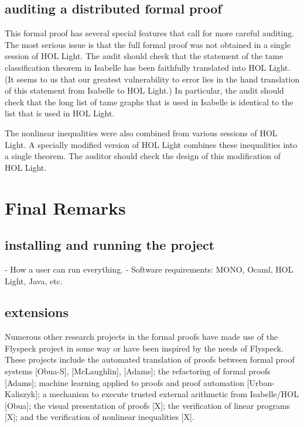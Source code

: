 \subsection{auditing a distributed formal proof}

This formal proof has several special features that call for more
careful auditing.  The most serious issue is that the full formal
proof was not obtained in a single session of HOL Light.  The audit
should check that the statement of the tame classification theorem in
Isabelle has been faithfully translated into HOL Light.  (It seems to
us that our greatest vulnerability to error lies in the hand
translation of this statement from Isabelle to HOL Light.)  In
particular, the audit should check that the long list of tame graphs
that is used in Isabelle is identical to the list that is used in HOL
Light.

The nonlinear inequalities were also combined from various sessions of
HOL Light.  A specially modified version of HOL Light combines these
inequalities into a single theorem.  The auditor should check the
design of this modification of HOL Light.


\section{Final Remarks}


\subsection{installing and running the project}
- How a user can run everything.
- Software requirements: MONO, Ocaml, HOL Light, Java, etc.



\subsection{extensions}

Numerous other research projects in the formal proofs have made use of the Flyspeck project in some way or have been inspired by
the needs of Flyspeck.  These projects include the automated translation of proofs between formal proof systems
[Obua-S], [McLaughlin], [Adams]; the refactoring of formal proofs [Adams]; machine learning applied to proofs and
proof automation [Urban-Kaliszyk]; a mechanism to execute trusted external arithmetic 
from Isabelle/HOL [Obua]; the visual presentation of proofs [X]; the verification of linear programs [X]; and the
verification of nonlinear inequalities [X].


